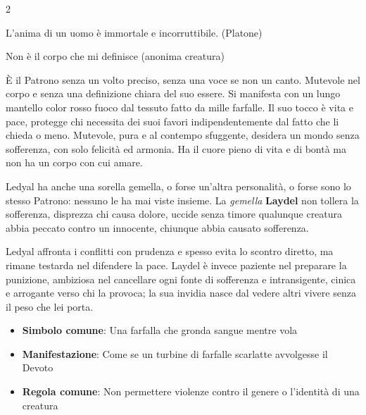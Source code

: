 \begin{multicols}{2}
\begin{enfasi}{
L'anima di un uomo è immortale e incorruttibile. (Platone)

\medskip

Non è il corpo che mi definisce (anonima creatura)
}\end{enfasi}

È il Patrono senza un volto preciso, senza una voce se non un canto. Mutevole nel corpo e senza una definizione chiara del suo essere. Si manifesta con un lungo mantello color rosso fuoco dal tessuto fatto da mille farfalle. Il suo tocco è vita e pace, protegge chi necessita dei suoi favori indipendentemente dal fatto che li chieda o meno. Mutevole, pura e al contempo sfuggente, desidera un mondo senza sofferenza, con solo felicità ed armonia. Ha il cuore pieno di vita e di bontà ma non ha un corpo con cui amare.

Ledyal ha anche una sorella gemella, o forse un'altra personalità, o forse sono lo stesso Patrono: nessuno le ha mai viste insieme. La \emph{gemella} \textbf{Laydel} non tollera la sofferenza, disprezza chi causa dolore, uccide senza timore qualunque creatura abbia peccato contro un innocente, chiunque abbia causato sofferenza.

Ledyal affronta i conflitti con prudenza e spesso evita lo scontro diretto, ma rimane testarda nel difendere la pace. Laydel è invece paziente nel preparare la punizione, ambiziosa nel cancellare ogni fonte di sofferenza e intransigente, cinica e arrogante verso chi la provoca; la sua invidia nasce dal vedere altri vivere senza il peso che lei porta.

\begin{itemize}[leftmargin=*] \setlength{\itemsep}{0pt}
\item \textbf{Simbolo comune}: Una farfalla che gronda sangue mentre vola
\item \textbf{Manifestazione}: Come se un turbine di farfalle scarlatte avvolgesse il Devoto
\item \textbf{Regola comune}: Non permettere violenze contro il genere o l'identità di una creatura
\end{itemize}


\end{multicols}
